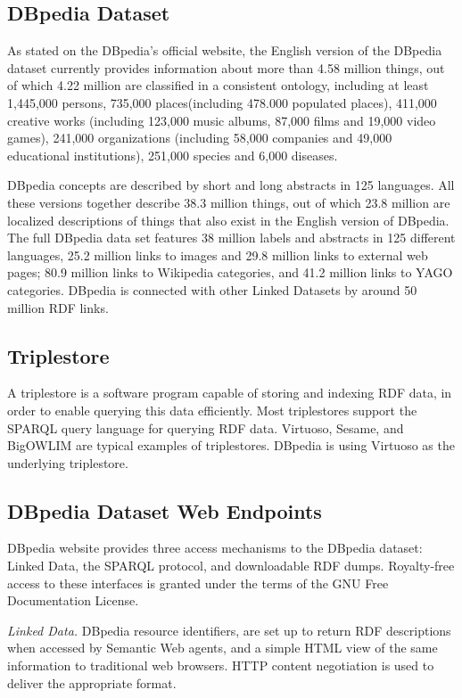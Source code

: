 \documentclass[thesis=M,english,hidelinks]{FITthesis}[2019/12/23]
\begin{document}
\subsection{DBpedia Dataset}

As stated on the DBpedia's official website\cite{DBpedia_facts}, the English version of the DBpedia dataset currently provides information about more than 4.58 million things, out of which 4.22 million are classified in a consistent ontology, including at least 1,445,000 persons, 735,000 places(including 478.000 populated places), 411,000 creative works (including 123,000 music albums, 87,000 films and 19,000 video games), 241,000 organizations (including 58,000 companies and 49,000 educational institutions), 251,000 species and 6,000 diseases.

DBpedia concepts are described by short and long abstracts in 125 languages. All these versions together describe 38.3 million things, out of which 23.8 million are localized descriptions of things that also exist in the English version of DBpedia. The full DBpedia data set features 38 million labels and abstracts in 125 different languages, 25.2 million links to images and 29.8 million links to external web pages; 80.9 million links to Wikipedia categories, and 41.2 million links to YAGO categories. DBpedia is connected with other Linked Datasets by around 50 million RDF links.

\subsection{Triplestore}

A triplestore is a software program capable of storing and indexing RDF data, in order to enable querying this data efficiently. Most triplestores support the SPARQL query language for querying RDF data. Virtuoso, Sesame, and BigOWLIM are typical examples of triplestores. DBpedia is using Virtuoso as the underlying triplestore.

\subsection{DBpedia Dataset Web Endpoints}

DBpedia website provides three access mechanisms to the DBpedia dataset: Linked Data, the SPARQL protocol, and downloadable RDF dumps. Royalty-free access to these interfaces is granted under the terms of the GNU Free Documentation License.

\textit{Linked Data.} DBpedia resource identifiers, are set up to return RDF descriptions when accessed by Semantic Web agents, and a simple HTML view of the same information to traditional web browsers. HTTP content negotiation is used to deliver the appropriate format.
\end{document}
